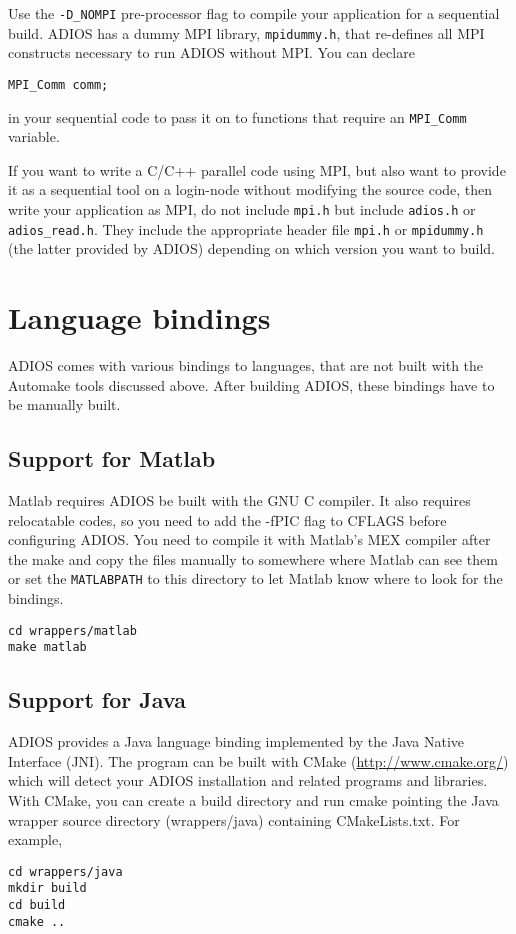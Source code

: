 Use the \verb+-D_NOMPI+ pre-processor flag to compile your application
for a sequential build. ADIOS has a dummy MPI library, \verb+mpidummy.h+, that re-defines
all MPI constructs necessary to run ADIOS without MPI. You can declare

\verb+MPI_Comm comm;+

in your sequential code to pass it on to functions that require an \verb+MPI_Comm+ variable.

If you want to write a C/C++ parallel code using MPI, but also want to provide it as a
sequential tool on a login-node without modifying the source code, then write your
application as MPI, do not include \verb+mpi.h+ but include
\verb+adios.h+ or \verb+adios_read.h+.
They include the appropriate header file
\verb+mpi.h+ or \verb+mpidummy.h+
(the latter provided by ADIOS) depending on which version you want to build.


\section{Language bindings}

ADIOS comes with various bindings to languages, that are not built with the Automake tools discussed above. After building ADIOS, these bindings have to be manually built.

\subsection{Support for Matlab}
\label{section-install-matlab}

Matlab requires ADIOS be built with the GNU C compiler. It also requires relocatable
codes, so you need to add the -fPIC flag to CFLAGS before configuring ADIOS.
You need to compile it with Matlab's MEX compiler after the make and copy the files
manually to somewhere where Matlab can see them or set the \verb+MATLABPATH+ to this
directory to let Matlab know where to look for the bindings.

\begin{lstlisting}
cd wrappers/matlab
make matlab
\end{lstlisting}


\subsection{Support for Java}
\label{section-install-java}

ADIOS provides a Java language binding implemented by the Java Native Interface (JNI).
The program can be built with CMake (\url{http://www.cmake.org/}) which will detect your ADIOS installation and related programs and libraries. With CMake, you can create a build directory and run cmake pointing the Java wrapper source directory (wrappers/java) containing CMakeLists.txt. For example,
\begin{lstlisting}
cd wrappers/java
mkdir build
cd build
cmake ..
\end{lstlisting}

